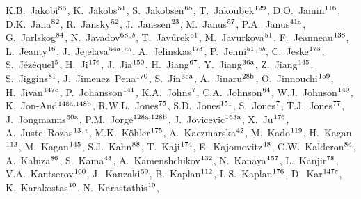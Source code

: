 \begin{flushleft}
K.B.~Jakobi$^\textrm{\scriptsize 86}$,
K.~Jakobs$^\textrm{\scriptsize 51}$,
S.~Jakobsen$^\textrm{\scriptsize 65}$,
T.~Jakoubek$^\textrm{\scriptsize 129}$,
D.O.~Jamin$^\textrm{\scriptsize 116}$,
D.K.~Jana$^\textrm{\scriptsize 82}$,
R.~Jansky$^\textrm{\scriptsize 52}$,
J.~Janssen$^\textrm{\scriptsize 23}$,
M.~Janus$^\textrm{\scriptsize 57}$,
P.A.~Janus$^\textrm{\scriptsize 41a}$,
G.~Jarlskog$^\textrm{\scriptsize 84}$,
N.~Javadov$^\textrm{\scriptsize 68}$$^{,b}$,
T.~Jav\r{u}rek$^\textrm{\scriptsize 51}$,
M.~Javurkova$^\textrm{\scriptsize 51}$,
F.~Jeanneau$^\textrm{\scriptsize 138}$,
L.~Jeanty$^\textrm{\scriptsize 16}$,
J.~Jejelava$^\textrm{\scriptsize 54a}$$^{,aa}$,
A.~Jelinskas$^\textrm{\scriptsize 173}$,
P.~Jenni$^\textrm{\scriptsize 51}$$^{,ab}$,
C.~Jeske$^\textrm{\scriptsize 173}$,
S.~J\'ez\'equel$^\textrm{\scriptsize 5}$,
H.~Ji$^\textrm{\scriptsize 176}$,
J.~Jia$^\textrm{\scriptsize 150}$,
H.~Jiang$^\textrm{\scriptsize 67}$,
Y.~Jiang$^\textrm{\scriptsize 36a}$,
Z.~Jiang$^\textrm{\scriptsize 145}$,
S.~Jiggins$^\textrm{\scriptsize 81}$,
J.~Jimenez~Pena$^\textrm{\scriptsize 170}$,
S.~Jin$^\textrm{\scriptsize 35a}$,
A.~Jinaru$^\textrm{\scriptsize 28b}$,
O.~Jinnouchi$^\textrm{\scriptsize 159}$,
H.~Jivan$^\textrm{\scriptsize 147c}$,
P.~Johansson$^\textrm{\scriptsize 141}$,
K.A.~Johns$^\textrm{\scriptsize 7}$,
C.A.~Johnson$^\textrm{\scriptsize 64}$,
W.J.~Johnson$^\textrm{\scriptsize 140}$,
K.~Jon-And$^\textrm{\scriptsize 148a,148b}$,
R.W.L.~Jones$^\textrm{\scriptsize 75}$,
S.D.~Jones$^\textrm{\scriptsize 151}$,
S.~Jones$^\textrm{\scriptsize 7}$,
T.J.~Jones$^\textrm{\scriptsize 77}$,
J.~Jongmanns$^\textrm{\scriptsize 60a}$,
P.M.~Jorge$^\textrm{\scriptsize 128a,128b}$,
J.~Jovicevic$^\textrm{\scriptsize 163a}$,
X.~Ju$^\textrm{\scriptsize 176}$,
A.~Juste~Rozas$^\textrm{\scriptsize 13}$$^{,v}$,
M.K.~K\"{o}hler$^\textrm{\scriptsize 175}$,
A.~Kaczmarska$^\textrm{\scriptsize 42}$,
M.~Kado$^\textrm{\scriptsize 119}$,
H.~Kagan$^\textrm{\scriptsize 113}$,
M.~Kagan$^\textrm{\scriptsize 145}$,
S.J.~Kahn$^\textrm{\scriptsize 88}$,
T.~Kaji$^\textrm{\scriptsize 174}$,
E.~Kajomovitz$^\textrm{\scriptsize 48}$,
C.W.~Kalderon$^\textrm{\scriptsize 84}$,
A.~Kaluza$^\textrm{\scriptsize 86}$,
S.~Kama$^\textrm{\scriptsize 43}$,
A.~Kamenshchikov$^\textrm{\scriptsize 132}$,
N.~Kanaya$^\textrm{\scriptsize 157}$,
L.~Kanjir$^\textrm{\scriptsize 78}$,
V.A.~Kantserov$^\textrm{\scriptsize 100}$,
J.~Kanzaki$^\textrm{\scriptsize 69}$,
B.~Kaplan$^\textrm{\scriptsize 112}$,
L.S.~Kaplan$^\textrm{\scriptsize 176}$,
D.~Kar$^\textrm{\scriptsize 147c}$,
K.~Karakostas$^\textrm{\scriptsize 10}$,
N.~Karastathis$^\textrm{\scriptsize 10}$,

\end{flushleft}
